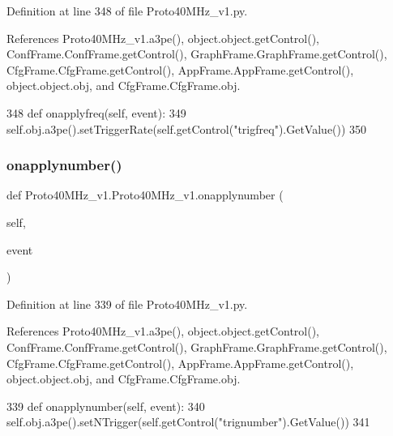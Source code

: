 Definition at line 348 of file Proto40\+M\+Hz\+\_\+v1.\+py.



References Proto40\+M\+Hz\+\_\+v1.\+a3pe(), object.\+object.\+get\+Control(), Conf\+Frame.\+Conf\+Frame.\+get\+Control(), Graph\+Frame.\+Graph\+Frame.\+get\+Control(), Cfg\+Frame.\+Cfg\+Frame.\+get\+Control(), App\+Frame.\+App\+Frame.\+get\+Control(), object.\+object.\+obj, and Cfg\+Frame.\+Cfg\+Frame.\+obj.


\begin{DoxyCode}
348     \textcolor{keyword}{def }onapplyfreq(self, event):
349         self.obj.a3pe().setTriggerRate(self.getControl(\textcolor{stringliteral}{"trigfreq"}).GetValue())
350 
\end{DoxyCode}
\mbox{\label{classProto40MHz__v1_1_1Proto40MHz__v1_a93922a09cbaefc409b6018fad42e9da2}} 
\subsubsection{\texorpdfstring{onapplynumber()}{onapplynumber()}}
{\footnotesize\ttfamily def Proto40\+M\+Hz\+\_\+v1.\+Proto40\+M\+Hz\+\_\+v1.\+onapplynumber (\begin{DoxyParamCaption}\item[{}]{self,  }\item[{}]{event }\end{DoxyParamCaption})}



Definition at line 339 of file Proto40\+M\+Hz\+\_\+v1.\+py.



References Proto40\+M\+Hz\+\_\+v1.\+a3pe(), object.\+object.\+get\+Control(), Conf\+Frame.\+Conf\+Frame.\+get\+Control(), Graph\+Frame.\+Graph\+Frame.\+get\+Control(), Cfg\+Frame.\+Cfg\+Frame.\+get\+Control(), App\+Frame.\+App\+Frame.\+get\+Control(), object.\+object.\+obj, and Cfg\+Frame.\+Cfg\+Frame.\+obj.


\begin{DoxyCode}
339     \textcolor{keyword}{def }onapplynumber(self, event):
340         self.obj.a3pe().setNTrigger(self.getControl(\textcolor{stringliteral}{"trignumber"}).GetValue())
341 
\end{DoxyCode}
\mbox{\label{classProto40MHz__v1_1_1Proto40MHz__v1_a02dd49010273fa59a8964c08aafe94c8}} 
